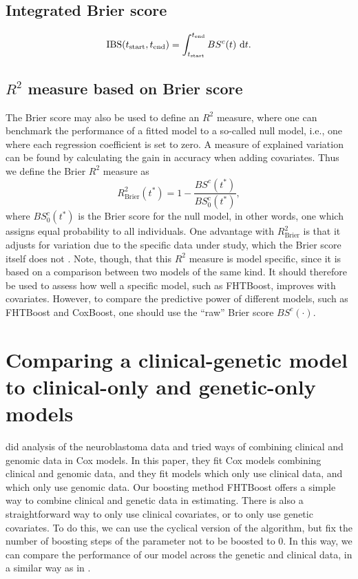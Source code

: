 \subsection{Integrated Brier score}
\begin{equation}
    \text{IBS}(t_{\text{start}}, t_{\text{end}})=\int_{t_{\text{start}}}^{t_{\text{end}}}BS^c(t)~\text{d} t.
\end{equation}

\subsection{$R^2$ measure based on Brier score}
The Brier score may also be used to define an $R^2$ measure, where one can benchmark the performance of a fitted model to a so-called null model, i.e., one where each regression coefficient is set to zero. A measure of explained variation can be found by calculating the gain in accuracy when adding covariates. Thus we define the Brier $R^2$ measure as
\begin{equation*}
    R^2_{\text{Brier}}(t^*)=1-\frac{BS^c(t^*)}{BS^c_0(t^*)},
\end{equation*}
where $BS^c_0(t^*)$ is the Brier score for the null model, in other words, one which assigns equal probability to all individuals.
One advantage with $R^2_{\text{Brier}}$ is that it adjusts for variation due to the specific data under study, which the Brier score itself does not \citep{bovelstadborgan}.
Note, though, that this $R^2$ measure is model specific, since it is based on a comparison between two models of the same kind.
It should therefore be used to assess how well a specific model, such as FHTBoost, improves with covariates.
However, to compare the predictive power of different models, such as FHTBoost and CoxBoost, one should use the ``raw'' Brier score $BS^c(\cdot)$.

\section{Comparing a clinical-genetic model to clinical-only and genetic-only models}
\citet{bovelstad2009} did analysis of the neuroblastoma data \citep{oberthuer-data} and tried ways of combining clinical and genomic data in Cox models.
In this paper, they fit Cox models combining clinical and genomic data, and they fit models which only use clinical data, and which only use genomic data.
Our boosting method FHTBoost offers a simple way to combine clinical and genetic data in estimating.
There is also a straightforward way to only use clinical covariates, or to only use genetic covariates.
To do this, we can use the cyclical version of the algorithm, but fix the number of boosting steps of the parameter not to be boosted to 0. 
In this way, we can compare the performance of our model across the genetic and clinical data, in a similar way as in \citet{bovelstad2009}.

